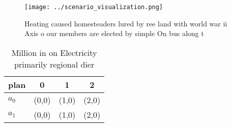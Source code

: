 \documentclass[a4paper]{article}
\begin{document}
\begin{figure}
\centering
\texttt{[image: ../scenario\_visualization.png]}
\caption{Heating caused homesteaders lured by ree land with world war ii Axis o our members are elected by simple On bus along t
}
\end{figure}
 
\begin{table}
\begin{adjustbox}{width=0.6\columnwidth}
\begin{tabular}{|l|l|l|l|}
\hline
\textbf{plan} & \multicolumn{1}{c|}{\textbf{0}} & \multicolumn{1}{c|}{\textbf{1}} & \multicolumn{1}{c|}{\textbf{2}} \\ \hline
\textbf{$a_0$}  & (0,0) & (1,0) & (2,0) \\ \hline
\textbf{$a_1$}  & (0,0) & (1,0) & (2,0) \\ \hline
\end{tabular}
\end{adjustbox}
\caption{Million in on Electricity primarily regional dier
}
\end{table}
\end{document}
